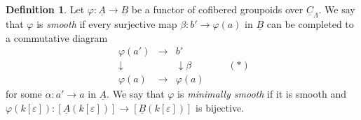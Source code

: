 \documentclass[11pt]{article}
\theoremstyle{plain}
\theoremstyle{definition}
\newtheorem{definition}[theorem]{Definition}
\theoremstyle{remark}
\newcommand{\uA}{\underline{A}}\newcommand{\uH}{\underline{H}}\newcommand{\uExt}{\underline{\operatorname{Ext}}}\newcommand{\uL}{\underline{L}}\newcommand{\uM}{\underline{M}}\newcommand{\uZ}{\underline{Z}}\newcommand{\uB}{\underline{B}}\newcommand{\uC}{\underline{C}}\newcommand{\uD}{\underline{D}}\newcommand{\uE}{\underline{E}}\newcommand{\uG}{\underline{G}}\newcommand{\uP}{\underline{P}}\newcommand{\uQ}{\underline{Q}}
\begin{document}
\begin{definition}
Let $\varphi : \uA \longrightarrow \uB$ be a functor of cofibered groupoids over $\underline{C}_{\Lambda}$. We say that $\varphi$ is \emph{smooth} if every surjective map $\beta : b' \longrightarrow \varphi(a)$ in $\uB$ can be completed to a commutative diagram
\[
\begin{array}{ccc}
\varphi(a') & \longrightarrow & b' \\
\downarrow & & \downarrow \beta \\
\varphi(a) & \longrightarrow & \varphi(a)
\end{array}
\qquad (*)
\]
for some $\alpha : a' \longrightarrow a$ in $\uA$. We say that $\varphi$ is \emph{minimally smooth} if it is smooth and $\varphi(k[\varepsilon]) : [\uA(k[\varepsilon])] \longrightarrow [\uB(k[\varepsilon])]$ is bijective.
\end{definition}
\end{document}
